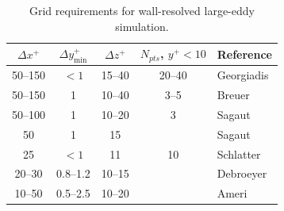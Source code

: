 \begin{table}
\begin{center}
\caption{Grid requirements for wall-resolved large-eddy simulation.}
\label{TAB:WRLES_Grid_Reqs}
\begin{tabular}{ccccl}
  \toprule
  $\Delta x^+$ & $\Delta y^+_\text{min}$ & $\Delta z^+$ &
  $N_{pts}$, $y^+ \!\! < \!\! 10$ & Reference \\
  \midrule
  50--150 &   $< 1$  & 15--40 & 20--40 & Georgiadis\cite{Georgiadis_2009} \\
  50--150 &      1   & 10--40 &  3--5  & Breuer\cite{Breuer_2007} \\
  50--100 &      1   & 10--20 &     3  & Sagaut\cite{Sagaut_2007} \\
  50      &      1   & 15     &        & Sagaut\cite{Sagaut_2009} \\
  25      &   $< 1$  & 11     & 10     & Schlatter\cite{Schlatter_2010} \\
  20--30  & 0.8--1.2 & 10--15 &        & Debroeyer\cite{Debroeyer_2024} \\
  10--50  & 0.5--2.5 & 10--20 &        & Ameri\cite{Ameri_2016} \\
  \bottomrule
\end{tabular}
\end{center}
\end{table}



